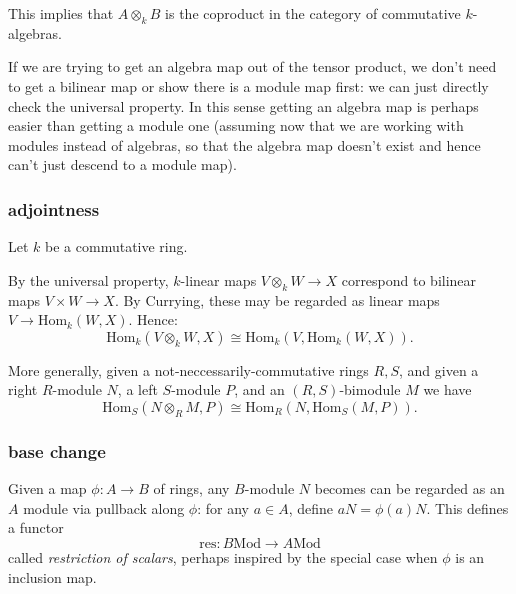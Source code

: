 \documentclass[12pt]{article}
\begin{document}
\begin{remark}
	This implies that $A\otimes_k B$ is the coproduct in the category of commutative $k$-algebras.
\end{remark}

\begin{remark}
	If we are trying to get an algebra map out of the tensor product, we don't need to get a bilinear map or show there is a module map first: we can just directly check the universal property. In this sense getting an algebra map is perhaps easier than getting a module one (assuming now that we are working with modules instead of algebras, so that the algebra map doesn't exist and hence can't just descend to a module map).
\end{remark}


\subsubsection{adjointness} %

Let $k$ be a commutative ring.

By the universal property, $k$-linear maps $V\otimes_k W\to X$ correspond to bilinear maps $V\times W\to X$. By Currying, these may be regarded as linear maps $V\to \text{Hom}_k(W,X)$. Hence:
\begin{equation*}
	\text{Hom}_k(V\otimes_k W, X) \cong \text{Hom}_k(V, \text{Hom}_k(W,X)).
\end{equation*}

More generally, given a not-neccessarily-commutative rings $R,S$, and given a right $R$-module $N$, a left $S$-module $P$, and an $(R,S)$-bimodule $M$ we have 
\begin{equation*}
	\text{Hom}_S(N\otimes_R M, P) \cong \text{Hom}_R(N,\text{Hom}_S(M,P)).
\end{equation*}


\subsubsection{base change} %

Given a map $\phi:A\to B$ of rings, any $B$-module $N$ becomes can be regarded as an $A$ module via pullback along $\phi$: for any $a\in A$, define $aN=\phi(a)N$. This defines a functor 
\begin{equation*}
	\text{res}: B\text{Mod} \to A\text{Mod}
\end{equation*}
called \emph{restriction of scalars}, perhaps inspired by the special case when $\phi$ is an inclusion map.
\end{document}
